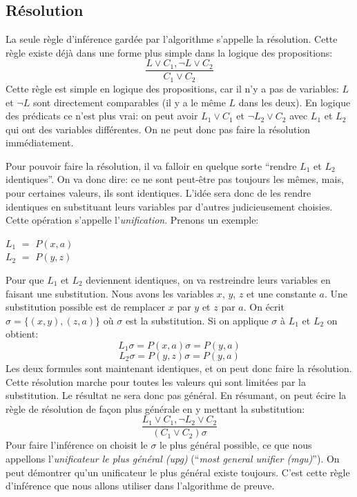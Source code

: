 {\subsection{Résolution}

La seule règle d'inférence gardée par l'algorithme s'appelle la résolution.
Cette règle existe déjà dans une forme plus simple dans la
logique des propositions: $$\frac{L\lor C_1, \neg L \lor C_2}{C_1\lor C_2}$$
Cette règle est simple en logique des propositions, car il n'y a pas de variables: $L$ et $\neg L$ sont directement comparables
(il y a le même $L$ dans les deux).
En logique des prédicats ce n'est plus vrai: on peut avoir $L_1 \lor C_1$ et $\neg L_2 \lor C_2$  avec $L_1$ et $L_2$ qui ont
des variables différentes.
On ne peut donc pas faire la résolution immédiatement.

Pour pouvoir faire la résolution, il va falloir en quelque sorte ``rendre $L_1$ et $L_2$ identiques''.
On va donc dire: ce ne sont peut-être pas toujours les mêmes, mais, pour certaines valeurs, ils sont identiques.
L'idée sera donc de les rendre identiques en substituant leurs variables par d'autres judicieusement choisies.
Cette opération s'appelle l'{\em unification}.
Prenons un exemple:

\begin{minipage}{0.25\textwidth}
		$L_1$ $=$ $P(x,a)$ \\
		$L_2$ $=$ $P(y,z)$
\end{minipage}

Pour que $L_1$ et $L_2$ deviennent identiques, on va restreindre leurs variables en faisant une substitution.
Nous avons les variables $x$, $y$, $z$ et une constante $a$.
Une substitution possible est de remplacer $x$ par $y$ et $z$ par $a$.
On écrit $\sigma = \{(x,y),(z,a)\}$ où $\sigma$ est la substitution.
Si on applique $\sigma$ à $L_1$ et $L_2$ on obtient:
$$L_1 \sigma = P(x,a) \sigma = P(y,a)$$
$$L_2 \sigma = P(y,z) \sigma = P(y,a)$$
Les deux formules sont maintenant identiques, et on peut donc faire la résolution.
Cette résolution marche pour toutes les valeurs qui sont limitées par la substitution.
Le résultat ne sera donc pas général.
En résumant, on peut écire la règle de résolution de façon plus générale en y mettant la substitution:
$$\frac{L_1 \lor C_1, \neg L_2 \lor C_2}{(C_1 \lor C_2)\sigma}$$
Pour faire l'inférence
on choisit le $\sigma$ le plus général possible, ce que nous appellons
l'{\em unificateur le plus général (upg)} (``{\em most general unifier (mgu)}'').
On peut démontrer qu'un unificateur le plus général existe toujours.
C'est cette règle d'inférence que nous allons utiliser dans l'algorithme de preuve.

}
